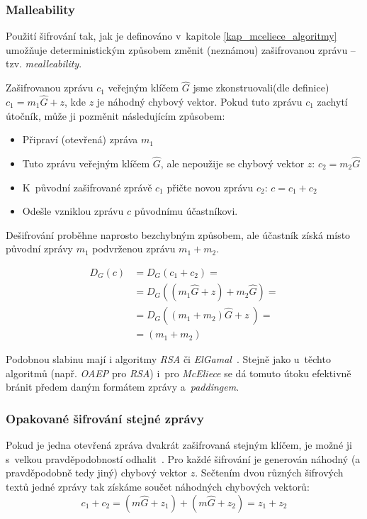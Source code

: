 \documentclass[thesis=M,czech,hidelinks]{FITthesis}[2012/06/26]
\newcommand{\0}{{\textcolor[gray]{0.75}{0}}}
\begin{document}
\subsubsection{Malleability}

Použití šifrování tak, jak je definováno v~kapitole \ref{kap_mceliece_algoritmy}
umožňuje deterministickým způsobem změnit (neznámou) zašifrovanou zprávu -- tzv.
\emph{mealleability}.

Zašifrovanou zprávu $c_1$ veřejným klíčem $\hat{G}$ jsme zkonstruovali(dle
definice) $c_1 = m_1\hat{G} + z$, kde $z$ je náhodný chybový vektor. Pokud
tuto zprávu $c_1$ zachytí útočník, může ji pozměnit následujícím způsobem:

\begin{itemize}
    \item Připraví (otevřená) zpráva $m_1$
    \item Tuto zprávu  veřejným klíčem $\hat{G}$, ale nepoužije
        se chybový vektor $z$: $c_2 = m_2\hat{G}$
    \item K~původní zašifrované zprávě $c_1$ přičte novou zprávu $c_2$:
        $c = c_1 + c_2$
    \item Odešle vzniklou zprávu $c$ původnímu účastníkovi.
\end{itemize}

Dešifrování proběhne naprosto bezchybným způsobem, ale účastník získá místo
původní zprávy $m_1$ podvrženou zprávu $m_1+m_2$.

\begin{align*}
    D_G\left(c\right) &= D_G\left( c_1 + c_2 \right) = \\
                      &= D_G\left( (m_1\hat{G} + z) + m_2\hat{G} \right) = \\
                      &= D_G\left( (m_1+m_2)\hat{G} + z~\right) =\\
                      &= (m_1+m_2)
\end{align*}

Podobnou slabinu mají i algoritmy \emph{RSA} či \emph{ElGamal}~\cite{FIT_KRY}.
Stejně jako u~těchto algoritmů (např. \emph{OAEP} pro \emph{RSA}) i~pro
\emph{McEliece} se dá tomuto útoku efektivně bránit předem daným formátem zprávy
a~\emph{paddingem}.


\subsubsection{Opakované šifrování stejné zprávy}

Pokud je jedna otevřená zpráva dvakrát zašifrovaná stejným klíčem, je možné ji
s~velkou pravděpodobností odhalit~\cite{Berson}. Pro každé šifrování je
generován náhodný (a pravděpodobně tedy jiný) chybový vektor $z$. Sečtením dvou
různých šifrových textů jedné zprávy tak získáme součet náhodných chybových
vektorů:
$$ c_1 + c_2 = (m\hat{G} + z_1) + (m\hat{G} + z_2) = z_1 + z_2 $$
\end{document}

